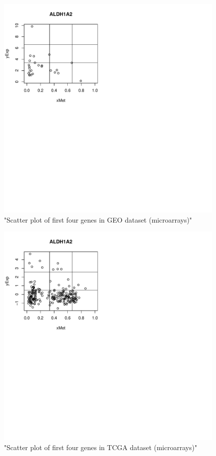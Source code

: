 \documentclass[a4paper,10pt]{article}\usepackage[]{graphicx}\usepackage[]{xcolor}
\makeatletter
\def\maxwidth{ %
  \ifdim\Gin@nat@width>\linewidth
    \linewidth
  \else
    \Gin@nat@width
  \fi
}
\newenvironment{knitrout}{}{} %
\makeatother
\begin{document}
\begin{figure}
\begin{knitrout}
\color{fgcolor}
\includegraphics[width=\maxwidth]{figure/plot4Genes3-1} 
\end{knitrout}
\caption{"Scatter plot of first four genes in GEO dataset (microarrays)"\label{plot4Genes3}}
\end{figure}

\begin{figure}
\begin{knitrout}
\color{fgcolor}
\includegraphics[width=\maxwidth]{figure/plot4Genes4-1} 
\end{knitrout}
\caption{"Scatter plot of first four genes in TCGA dataset (microarrays)"\label{plot4Genes4}}
\end{figure}
\end{document}
